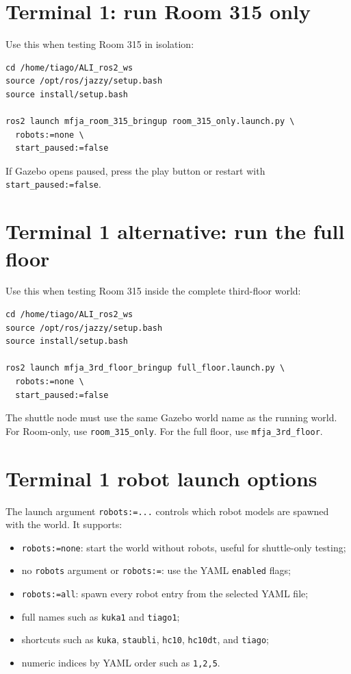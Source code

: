\documentclass[12pt,a4paper]{report}
\begin{document}
\section{Terminal 1: run Room 315 only}

Use this when testing Room 315 in isolation:

\begin{lstlisting}[style=terminalcode]
cd /home/tiago/ALI_ros2_ws
source /opt/ros/jazzy/setup.bash
source install/setup.bash

ros2 launch mfja_room_315_bringup room_315_only.launch.py \
  robots:=none \
  start_paused:=false
\end{lstlisting}

If Gazebo opens paused, press the play button or restart with
\texttt{start\_paused:=false}.

\section{Terminal 1 alternative: run the full floor}

Use this when testing Room 315 inside the complete third-floor world:

\begin{lstlisting}[style=terminalcode]
cd /home/tiago/ALI_ros2_ws
source /opt/ros/jazzy/setup.bash
source install/setup.bash

ros2 launch mfja_3rd_floor_bringup full_floor.launch.py \
  robots:=none \
  start_paused:=false
\end{lstlisting}

The shuttle node must use the same Gazebo world name as the running world. For
Room-only, use \texttt{room\_315\_only}. For the full floor, use
\texttt{mfja\_3rd\_floor}.

\section{Terminal 1 robot launch options}

The launch argument \texttt{robots:=...} controls which robot models are spawned
with the world. It supports:

\begin{itemize}
\item \texttt{robots:=none}: start the world without robots, useful for shuttle-only testing;
\item no \texttt{robots} argument or \texttt{robots:=}: use the YAML
\texttt{enabled} flags;
\item \texttt{robots:=all}: spawn every robot entry from the selected YAML file;
\item full names such as \texttt{kuka1} and \texttt{tiago1};
\item shortcuts such as \texttt{kuka}, \texttt{staubli}, \texttt{hc10},
\texttt{hc10dt}, and \texttt{tiago};
\item numeric indices by YAML order such as \texttt{1,2,5}.
\end{itemize}
\end{document}
